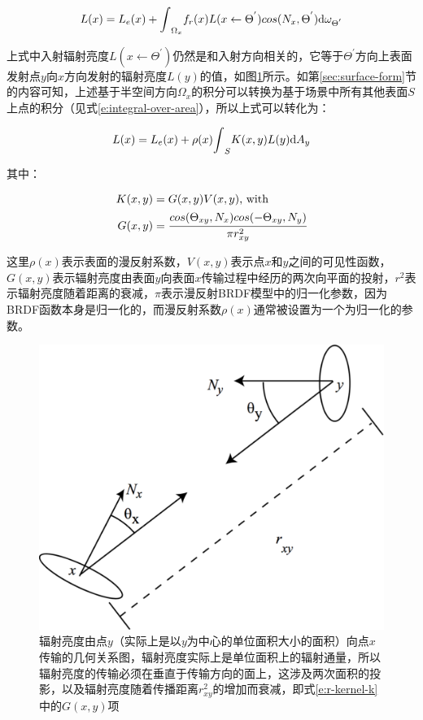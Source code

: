 \begin{equation}\label{e:r-radiosity-temp}
	L(x)=L_e(x)+{\rm \int}_{\Omega_x}f_r(x)L(x\leftarrow\Theta^{'})cos(N_x,\Theta^{'}){\rm d}\omega_{\Theta^{'}}
\end{equation}

\noindent 上式中入射辐射亮度$L(x\leftarrow\Theta^{'})$仍然是和入射方向相关的，它等于$\Theta^{'}$方向上表面发射点$y$向$x$方向发射的辐射亮度$L(y)$的值，如图\ref{f:r-the-geometry-of-the-surfaces}所示。如第\ref{sec:surface-form}节的内容可知，上述基于半空间方向$\Omega_x$的积分可以转换为基于场景中所有其他表面$S$上点的积分（见式\ref{e:integral-over-area}），所以上式可以转化为：

\begin{equation}
	L(x)=L_e(x)+\rho(x){\rm \int}_{S}K(x,y)L(y){\rm d}A_y
\end{equation}

\noindent 其中：

\begin{equation}\label{e:r-kernel-k}
\begin{aligned}
	K(x,y)&=G(x,y)V(x,y) \text{, with }\\
		G(x,y)&= \cfrac{cos(\Theta_{xy},N_x)cos(-\Theta_{xy},N_y)}{\pi r^{2}_{xy}}
\end{aligned}
\end{equation}

\noindent 这里$\rho(x)$表示表面的漫反射系数，$V(x,y)$表示点$x$和$y$之间的可见性函数，$G(x,y)$表示辐射亮度由表面$y$向表面$x$传输过程中经历的两次向平面的投射，$r^{2}$表示辐射亮度随着距离的衰减，$\pi$表示漫反射BRDF模型中的归一化参数，因为BRDF函数本身是归一化的，而漫反射系数$\rho(x)$通常被设置为一个为归一化的参数。

\begin{figure}
\sidecaption
	\includegraphics[width=.55\textwidth]{graphics/gi/path-18}
	\caption{辐射亮度由点$y$（实际上是以$y$为中心的单位面积大小的面积）向点$x$传输的几何关系图，辐射亮度实际上是单位面积上的辐射通量，所以辐射亮度的传输必须在垂直于传输方向的面上，这涉及两次面积的投影，以及辐射亮度随着传播距离$r^{2}_{xy}$的增加而衰减，即式\ref{e:r-kernel-k}中的$G(x,y)$项}
	\label{f:r-the-geometry-of-the-surfaces}
\end{figure}

